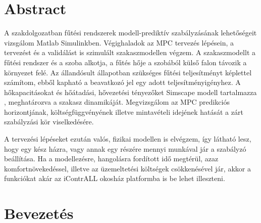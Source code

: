 \chapter*{Abstract}

A szakdolgozatban fűtési rendszerek modell-prediktív szabályzásának lehetőségeit vizsgálom Matlab Simulinkben. %
Végighaladok az MPC tervezés lépésein, a tervezést és a validálást is szimulált szakaszmodellen végzem. A szakaszmodellt a fűtési rendszer és a szoba alkotja, a fűtés hője a szobából külső falon távozik a környezet felé. Az állandósult állapotban szükséges fűtési teljesítményt képlettel számítom, ebből kapható a beavatkozó jel egy adott teljesítményigényhez. A hőkapacitásokat és hőátadási, hővezetési tényezőket Simscape modell tartalmazza%
, meghatározva a szakasz dinamikáját. Megvizsgálom az MPC predikciós horizontjának, költségfüggvényének illetve mintavételi idejének hatását a zárt szabályzási kör viselkedésére.  %

A tervezési lépéseket ezután valós, fizikai modellen is elvégzem, így látható lesz, hogy egy kész házra, vagy annak egy részére mennyi munkával jár a szabályzó beállítása. Ha a modellezésre, hangolásra fordított idő megtérül, azaz komfortnövekedéssel, illetve az üzemeltetési költségek csökkenésével jár, akkor a funkciókat akár az iContrALL okosház platformba is be lehet illeszteni.



\chapter{Bevezetés}

%
%
%


